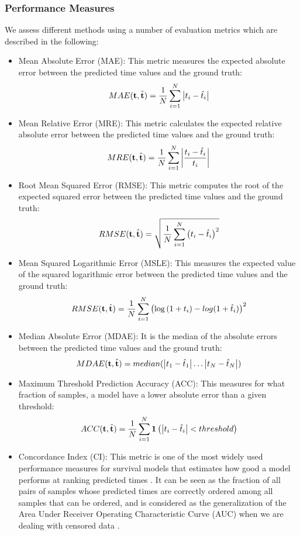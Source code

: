 \subsubsection{Performance Measures}
We assess different methods using a number of evaluation metrics which are described in the following:
\begin{itemize}
\item Mean Absolute Error (MAE): This metric measures the expected absolute error between the predicted time values and the ground truth:
\[MAE(\mathbf{t},\hat{\mathbf{t}}) = \frac{1}{N}\sum_{i=1}^{N}\left|t_i-\hat{t}_i\right|\]
\item Mean Relative Error (MRE): This metric calculates the expected relative absolute error between the predicted time values and the ground truth:
\[MRE(\mathbf{t},\hat{\mathbf{t}}) = \frac{1}{N}\sum_{i=1}^{N}\left|\frac{t_i-\hat{t}_i}{t_i}\right|\]
\item Root Mean Squared Error (RMSE): This metric computes the root of the expected squared error between the predicted time values and the ground truth:
\[RMSE(\mathbf{t},\hat{\mathbf{t}}) = \sqrt{\frac{1}{N}\sum_{i=1}^{N}\left(t_i-\hat{t}_i\right)^2}\]
\item Mean Squared Logarithmic Error (MSLE): This measures the expected value of the squared logarithmic error between the predicted time values and the ground truth:
\[RMSE(\mathbf{t},\hat{\mathbf{t}}) = \frac{1}{N}\sum_{i=1}^{N}\left(\log{(1+t_i)}-log{(1+\hat{t}_i)}\right)^2\]
\item Median Absolute Error (MDAE): It is the median of the absolute errors between the predicted time values and the ground truth:
\[MDAE(\mathbf{t},\hat{\mathbf{t}}) = median(\left|t_1-\hat{t}_1\right|\dots\left|t_N-\hat{t}_N\right|)\]
\item Maximum Threshold Prediction Accuracy (ACC): This measures for what fraction of samples, a model have a lower absolute error than a given threshold:
\[ACC(\mathbf{t},\hat{\mathbf{t}})=\frac{1}{N}\sum_{i=1}^{N}\mathbf{1}\left(\left|t_i-\hat{t}_i\right| < threshold\right)\]
\item \color{red}Concordance Index (CI): This metric is one of the most widely used performance measures for survival models that estimates how good a model performs at ranking predicted times \cite{harrell1982evaluating}. It can be seen as the fraction of all pairs of samples whose predicted times are correctly ordered among all samples that can be ordered, and is considered as the generalization of the Area Under Receiver Operating Characteristic Curve (AUC) when we are dealing with censored data \cite{steck2008ranking}.
\end{itemize}

